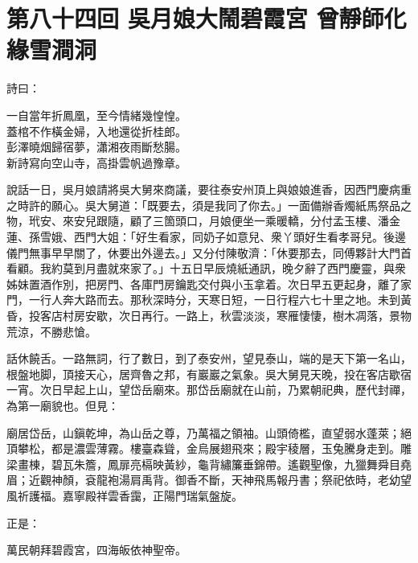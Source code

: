 
\chapter*{第八十四回 吳月娘大鬧碧霞宮 曾靜師化緣雪澗洞}


詩曰：

\begin{myquote}
一自當年折鳳凰，至今情緒幾惶惶。\\蓋棺不作橫金婦，入地還從折桂郎。\\彭澤曉烟歸宿夢，瀟湘夜雨斷愁腸。\\新詩寫向空山寺，高掛雲帆過豫章。
\end{myquote}

說話一日，吳月娘請將吳大舅來商議，要往泰安州頂上與娘娘進香，因西門慶病重之時許的願心。吳大舅道：「既要去，須是我同了你去。」一面備辦香燭紙馬祭品之物，玳安、來安兒跟隨，顧了三箇頭口，月娘便坐一乘暖轎，分付孟玉樓、潘金蓮、孫雪娥、西門大姐：「好生看家，同奶子如意兒、衆丫頭好生看孝哥兒。後邊儀門無事早早關了，休要出外邊去。」又分付陳敬濟：「休要那去，同傅夥計大門首看顧。我約莫到月盡就來家了。」{}十五日早辰燒紙通訊，晚夕辭了西門慶靈，與衆姊妹置酒作別，把房門、各庫門房鑰匙交付與小玉拿着。次日早五更起身，離了家門，一行人奔大路而去。那秋深時分，天寒日短，一日行程六七十里之地。未到黃昏，投客店村房安歇，次日再行。一路上，秋雲淡淡，寒雁悽悽，樹木凋落，景物荒涼，不勝悲愴。

話休饒舌。一路無詞，行了數日，到了泰安州，望見泰山，端的是天下第一名山，根盤地脚，頂接天心，居齊魯之邦，有巖巖之氣象。吳大舅見天晚，投在客店歇宿一宵。次日早起上山，望岱岳廟來。那岱岳廟就在山前，乃累朝祀典，歷代封禪，為第一廟貌也。但見：

\begin{myquote}
廟居岱岳，山鎭乾坤，為山岳之尊，乃萬福之領袖。山頭倚檻，直望弱水蓬萊；絕頂攀松，都是濃雲薄霧。樓臺森聳，金烏展翅飛來；殿宇稜層，玉兔騰身走到。雕梁畫棟，碧瓦朱簷，鳳扉亮槅映黃紗，龜背繡簾垂錦帶。遙觀聖像，九獵舞舜目堯眉；近觀神顏，袞龍袍湯肩禹背。御香不斷，天神飛馬報丹書；祭祀依時，老幼望風祈護福。嘉寧殿祥雲香靄，正陽門瑞氣盤旋。
\end{myquote}

正是：

\begin{myquote}
萬民朝拜碧霞宮，四海皈依神聖帝。
\end{myquote}

